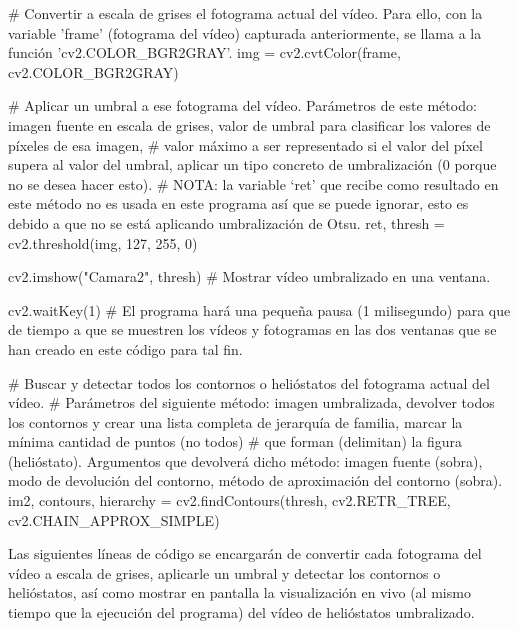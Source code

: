 \documentclass[12pt]{article}
\begin{document}
    \# Convertir a escala de grises el fotograma actual del vídeo. Para ello, con la variable 'frame' (fotograma del vídeo) capturada anteriormente, se llama a la función 'cv2.COLOR\_BGR2GRAY'.
    img = cv2.cvtColor(frame, cv2.COLOR\_BGR2GRAY)
    
    \# Aplicar un umbral a ese fotograma del vídeo. Parámetros de este método: imagen fuente en escala de grises, valor de umbral para clasificar los valores de píxeles de esa imagen,
    \# valor máximo a ser representado si el valor del píxel supera al valor del umbral, aplicar un tipo concreto de umbralización (0 porque no se desea hacer esto).
    \# NOTA: la variable ‘ret’ que recibe como resultado en este método no es usada en este programa así que se puede ignorar, esto es debido a que no se está aplicando umbralización de Otsu.
    ret, thresh = cv2.threshold(img, 127, 255, 0)
    
    cv2.imshow("Camara2", thresh) \# Mostrar vídeo umbralizado en una ventana.

    cv2.waitKey(1) \# El programa hará una pequeña pausa (1 milisegundo) para que de tiempo a que se muestren los vídeos y fotogramas en las dos ventanas que se han creado en este código para tal fin.

    \# Buscar y detectar todos los contornos o helióstatos del fotograma actual del vídeo.
    \# Parámetros del siguiente método: imagen umbralizada, devolver todos los contornos y crear una lista completa de jerarquía de familia, marcar la mínima cantidad de puntos (no todos)
    \# que forman (delimitan) la figura (helióstato). Argumentos que devolverá dicho método: imagen fuente (sobra), modo de devolución del contorno, método de aproximación del contorno (sobra).
    im2, contours, hierarchy = cv2.findContours(thresh, cv2.RETR\_TREE, cv2.CHAIN\_APPROX\_SIMPLE)

Las siguientes líneas de código se encargarán de convertir cada fotograma del vídeo a escala de grises, aplicarle un umbral y detectar los contornos o helióstatos, así como mostrar en pantalla la visualización en vivo (al mismo tiempo que la ejecución del programa) del vídeo de helióstatos umbralizado.
\end{document}
